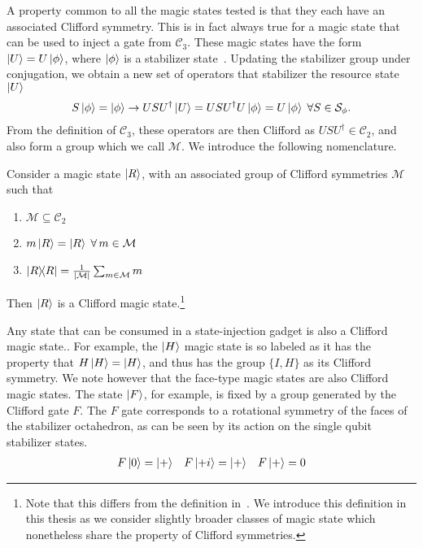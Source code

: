 A property common to all the magic states tested is that they each have an associated Clifford symmetry. This is in fact always true for a magic state that can be used to inject a gate from $\mathcal{C}_{3}$. These magic states have the form $\ket{U}=U\ket{\phi}$, where $\ket{\phi}$ is a stabilizer state~\cite{Gottesman1999}. Updating the stabilizer group under conjugation, we obtain a new set of operators that stabilizer the resource state $\ket{U}$
\begin{equation}
S\ket{\phi} =\ket{\phi} \rightarrow USU^{\dagger} \ket{U} = USU^{\dagger}U\ket{\phi} = U\ket{\phi}\;\forall S\in\mathcal{S}_{\phi}.
\end{equation}
From the definition of $\mathcal{C}_{3}$, these operators are then Clifford as $USU^{\dagger}\in\mathcal{C}_{2}$, and also form a group which we call $\mathcal{M}$. We introduce the following nomenclature.
\begin{defn}
Consider a magic state $\ket{R}$, with an associated group of Clifford symmetries $\mathcal{M}$ such that
\begin{enumerate}
    \item $\mathcal{M}\subseteq \mathcal{C}_{2}$
    \item $m\ket{R} =\ket{R}\;\forall\,m\in\mathcal{M}$
    \item $\ketbra{R}=\frac{1}{\left|\mathcal{M}\right|} \sum_{m\in\mathcal{M}} m $
\end{enumerate}
Then $\ket{R}$ is a Clifford magic state.\footnote{Note that this differs from the definition in~\cite{Bravyi2018}. We introduce this definition in this thesis as we consider slightly broader classes of magic state which nonetheless share the property of Clifford symmetries.}
\end{defn}
Any state that can be consumed in a state-injection gadget is also a Clifford magic state.. For example, the $\ket{H}$ magic state is so labeled as it has the property that $H\ket{H}=\ket{H}$, and thus has the group $\{I,H\}$ as its Clifford symmetry. We note however that the face-type magic states are also Clifford magic states. The state $\ket{F}$, for example, is fixed by a group generated by the Clifford gate $F$. The $F$ gate corresponds to a rotational symmetry of the faces of the stabilizer octahedron, as can be seen by its action on the single qubit stabilizer states.
\begin{equation}
\begin{array}{l c r}
F \ket{0}=\ket{+} & F\ket{+i} = \ket{+} & F\ket{+} = 0
\end{array}
\end{equation}
